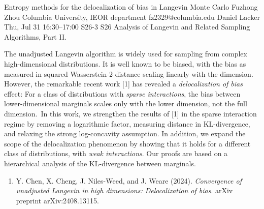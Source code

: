 \documentclass[12pt,lettersize,oneside]{book} %
\begin{document}
\begin{talk}
  {Entropy methods for the delocalization of bias in Langevin Monte Carlo}%
  {Fuzhong Zhou}%
  {Columbia University, IEOR department}%
  {fz2329@columbia.edu}%
  {Daniel Lacker}%
  {}%
  {Thu, Jul 31 16:30--17:00}%
  {S26-3}%
  {S26}%
  {Analysis of
   Langevin and Related Sampling Algorithms, Part II.}%
    
   
The unadjusted Langevin algorithm is widely used for sampling from complex high-dimensional distributions. It is well known to be biased, with the bias as measured in squared Wasserstein-2 distance scaling linearly with the dimension. However, the remarkable recent work [1] has revealed a \textit{delocalization of bias} effect: For a class of distributions with \textit{sparse interactions}, the bias between lower-dimensional marginals scales only with the lower dimension, not the full dimension. In this work, we strengthen the results of [1] in the sparse interaction regime by removing a logarithmic factor, measuring distance in KL-divergence, and relaxing the strong log-concavity assumption. In addition, we expand the scope of the delocalization phenomenon by showing that it holds for a different class of distributions, with \textit{weak interactions}. Our proofs are based on a hierarchical analysis of the KL-divergence between marginals.



\medskip



\begin{enumerate}
 \item[{[1]}] Y. Chen, X. Cheng, J. Niles-Weed, and J. Weare (2024). {\it Convergence of unadjusted Langevin in high dimensions: Delocalization of bias}. arXiv preprint arXiv:2408.13115.
\end{enumerate}


\end{talk}
\end{document}
